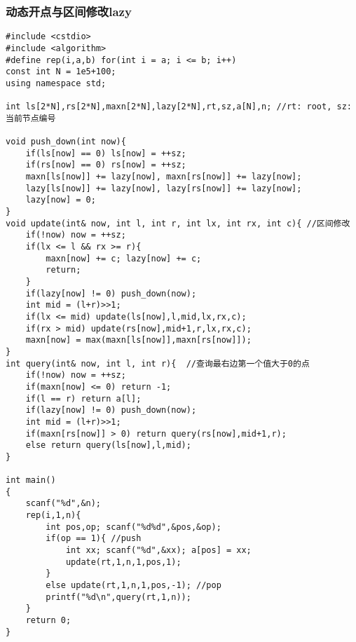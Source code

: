 \documentclass[twoside]{article}
\begin{document}
\subsubsection{动态开点与区间修改lazy}
\begin{lstlisting}
#include <cstdio>
#include <algorithm>
#define rep(i,a,b) for(int i = a; i <= b; i++)
const int N = 1e5+100;
using namespace std;

int ls[2*N],rs[2*N],maxn[2*N],lazy[2*N],rt,sz,a[N],n; //rt: root, sz: 当前节点编号

void push_down(int now){
	if(ls[now] == 0) ls[now] = ++sz;
	if(rs[now] == 0) rs[now] = ++sz;
	maxn[ls[now]] += lazy[now], maxn[rs[now]] += lazy[now];
	lazy[ls[now]] += lazy[now], lazy[rs[now]] += lazy[now];
	lazy[now] = 0;
}
void update(int& now, int l, int r, int lx, int rx, int c){ //区间修改
	if(!now) now = ++sz;
	if(lx <= l && rx >= r){
		maxn[now] += c; lazy[now] += c;
		return;
	}
	if(lazy[now] != 0) push_down(now);
	int mid = (l+r)>>1;
	if(lx <= mid) update(ls[now],l,mid,lx,rx,c);
	if(rx > mid) update(rs[now],mid+1,r,lx,rx,c);
	maxn[now] = max(maxn[ls[now]],maxn[rs[now]]);
}
int query(int& now, int l, int r){	//查询最右边第一个值大于0的点
	if(!now) now = ++sz;
	if(maxn[now] <= 0) return -1;
	if(l == r) return a[l];
	if(lazy[now] != 0) push_down(now);
	int mid = (l+r)>>1;
	if(maxn[rs[now]] > 0) return query(rs[now],mid+1,r);
	else return query(ls[now],l,mid);
}

int main()
{
	scanf("%d",&n);
	rep(i,1,n){
		int pos,op; scanf("%d%d",&pos,&op);
		if(op == 1){ //push
			int xx; scanf("%d",&xx); a[pos] = xx;
			update(rt,1,n,1,pos,1);
		}
		else update(rt,1,n,1,pos,-1); //pop
		printf("%d\n",query(rt,1,n));
	}
	return 0;
}\end{lstlisting}
\end{document}
